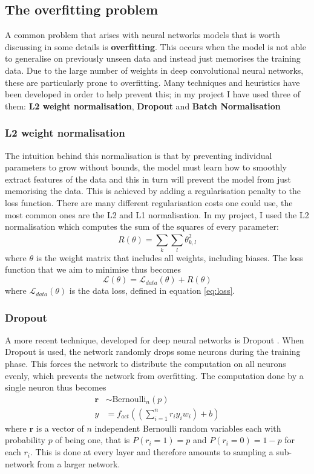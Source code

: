 \documentclass[12pt,a4paper,twoside,openright]{report}
\begin{document}
\subsection{The overfitting problem}
A common problem that arises with neural networks models that is worth discussing in some details is \textbf{overfitting}. This occurs when the model is not able to generalise on previously unseen data and instead just memorises the training data. Due to the large number of weights in deep convolutional neural networks, these are particularly prone to overfitting. Many techniques and heuristics have been developed in order to help prevent this; in my project I have used three of them: \textbf{L2 weight normalisation}, \textbf{Dropout} and \textbf{Batch Normalisation}
\subsubsection{\textbf{L2} weight normalisation}
The intuition behind this normalisation is that by preventing individual parameters to grow without bounds, the model must learn how to smoothly extract features of the data and this in turn will prevent the model from just memorising the data. This is achieved by adding a regularisation penalty to the loss function. There are many different regularisation costs one could use, the most common ones are the L2 and L1 normalisation. In my project, I used the L2 normalisation which computes the sum of the squares of every parameter:
\begin{equation}
	R(\theta) = \sum_{k}^{} \sum_{l}^{} \theta_{k,l}^2
\end{equation} 
where $\theta$ is the weight matrix that includes all weights, including biases.
The loss function that we aim to minimise thus becomes
\begin{equation}
	\mathcal{L}(\theta) = \mathcal{L}_{data}(\theta) + R(\theta) 
\end{equation}
where $\mathcal{L}_{data}(\theta)$ is the data loss, defined in equation \ref{eq:loss}. 

\subsubsection{Dropout}
A more recent technique, developed for deep neural networks is Dropout \cite{dropout}. When Dropout is used, the network randomly drops some neurons during the training phase. This forces the network to distribute the computation on all neurons evenly, which prevents the network from overfitting. The computation done by a single neuron thus becomes
\begin{equation}
\begin{split}
	\textbf{r} & \sim \text{Bernoulli}_n(p) \\
	y & = f_{act}((\sum_{i=1}^{n} r_i y_i w_i) + b)
\end{split}
\end{equation}
where $\textbf{r}$ is a vector of $n$ independent Bernoulli random variables each with probability $p$ of being one, that is $P(r_i = 1) = p$ and $P(r_i = 0) = 1 - p$ for each $r_i$. This is done at every layer and therefore amounts to sampling a sub-network from a larger network. 
\end{document}
